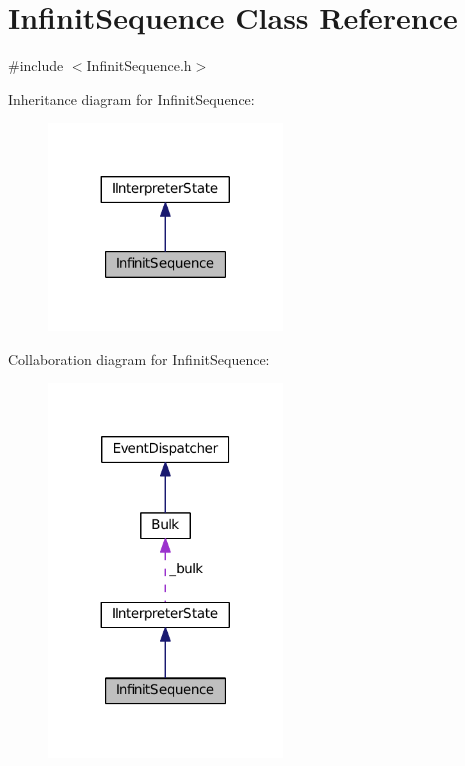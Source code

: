 \hypertarget{class_infinit_sequence}{}\section{Infinit\+Sequence Class Reference}
\label{class_infinit_sequence}


{\ttfamily \#include $<$Infinit\+Sequence.\+h$>$}



Inheritance diagram for Infinit\+Sequence\+:
\nopagebreak
\begin{figure}[H]
\begin{center}
\leavevmode
\includegraphics[width=176pt]{class_infinit_sequence__inherit__graph}
\end{center}
\end{figure}


Collaboration diagram for Infinit\+Sequence\+:
\nopagebreak
\begin{figure}[H]
\begin{center}
\leavevmode
\includegraphics[width=176pt]{class_infinit_sequence__coll__graph}
\end{center}
\end{figure}
